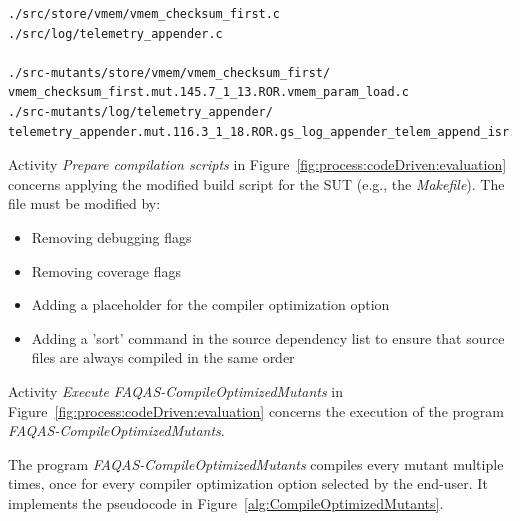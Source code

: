 \begin{verbatim}
./src/store/vmem/vmem_checksum_first.c
./src/log/telemetry_appender.c

./src-mutants/store/vmem/vmem_checksum_first/
vmem_checksum_first.mut.145.7_1_13.ROR.vmem_param_load.c
./src-mutants/log/telemetry_appender/
telemetry_appender.mut.116.3_1_18.ROR.gs_log_appender_telem_append_isr.c
\end{verbatim}


Activity \emph{Prepare compilation scripts} in Figure~\ref{fig:process:codeDriven:evaluation} concerns applying the modified build script for the SUT (e.g., the \emph{Makefile}). The file must be modified by:
\begin{itemize}
\item Removing debugging flags
\item Removing coverage flags
\item Adding a placeholder for the compiler optimization option
\item Adding a 'sort' command in the source dependency list to ensure that source files are always compiled in the same order
\end{itemize}


Activity \emph{Execute FAQAS-CompileOptimizedMutants} in Figure~\ref{fig:process:codeDriven:evaluation} concerns the execution of the program \emph{FAQAS-CompileOptimizedMutants}.

The program \emph{FAQAS-CompileOptimizedMutants} compiles every mutant multiple times, once for every compiler optimization option selected by the end-user. It implements the pseudocode in Figure~\ref{alg:CompileOptimizedMutants}.

